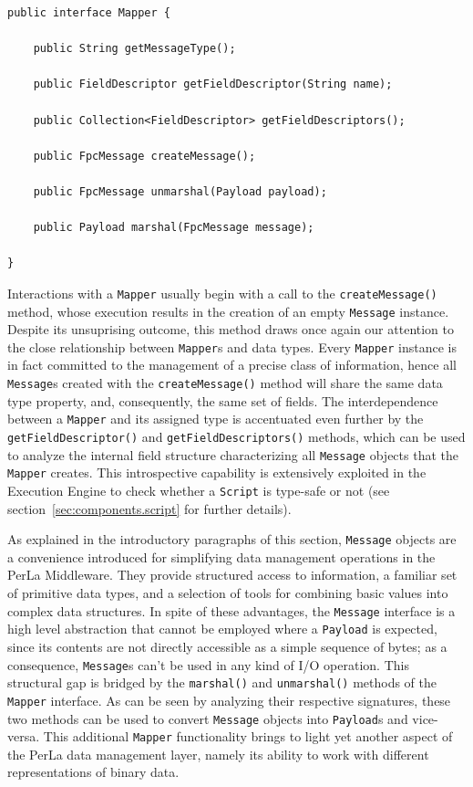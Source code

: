 \lstset{language=Java}
\begin{lstlisting}[float,floatplacement=!hbt,caption=The Mapper
interface,label={lst:mapper}]
public interface Mapper {

    public String getMessageType();

    public FieldDescriptor getFieldDescriptor(String name);

    public Collection<FieldDescriptor> getFieldDescriptors();

    public FpcMessage createMessage();

    public FpcMessage unmarshal(Payload payload);

    public Payload marshal(FpcMessage message);

}
\end{lstlisting}

Interactions with a \texttt{Mapper} usually begin with a call to the
\texttt{createMessage()} method, whose execution results in the creation of an
empty \texttt{Message} instance. Despite its unsuprising outcome, this method
draws once again our attention to the close relationship between
\texttt{Mapper}s and data types. Every \texttt{Mapper} instance is in fact
committed to the management of a precise class of information, hence all
\texttt{Message}s created with the \texttt{createMessage()} method will share
the same data type property, and, consequently, the same set of fields. The
interdependence between a \texttt{Mapper} and its assigned type is accentuated
even further by the \texttt{getFieldDescriptor()} and
\texttt{getFieldDescriptors()} methods, which can be used to analyze the
internal field structure characterizing all \texttt{Message} objects that the
\texttt{Mapper} creates. This introspective capability is extensively exploited
in the Execution Engine to check whether a \texttt{Script} is type-safe or not
(see section~\ref{sec:components.script} for further details).

As explained in the introductory paragraphs of this section, \texttt{Message}
objects are a convenience introduced for simplifying data management operations
in the PerLa Middleware. They provide structured access to information, a
familiar set of primitive data types, and a selection of tools for combining
basic values into complex data structures. In spite of these advantages, the
\texttt{Message} interface is a high level abstraction that cannot be employed
where a \texttt{Payload} is expected, since its contents are not directly
accessible as a simple sequence of bytes; as a consequence, \texttt{Message}s
can't be used in any kind of I/O operation. This structural gap is bridged by
the \texttt{marshal()} and \texttt{unmarshal()} methods of the \texttt{Mapper}
interface. As can be seen by analyzing their respective signatures, these two
methods can be used to convert \texttt{Message} objects into \texttt{Payload}s
and vice-versa. This additional \texttt{Mapper} functionality brings to light
yet another aspect of the PerLa data management layer, namely its ability to
work with different representations of binary data.

